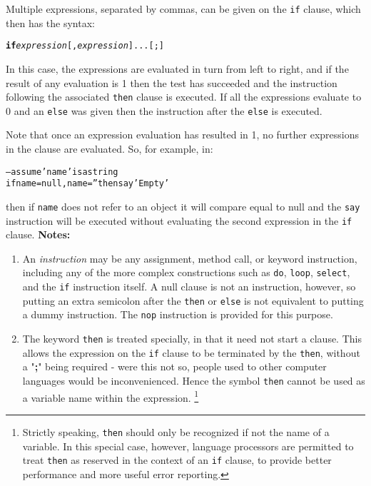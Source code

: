 Multiple expressions, separated by commas, can be given on the
\texttt{if} clause, which then has the syntax:
\begin{shaded}
\begin{alltt}
\textbf{if} \emph{expression}[, \emph{expression}]... [;]
\end{alltt}
\end{shaded}
In this case, the expressions are evaluated in turn from left to
right, and if the result of any evaluation is 1 then the test has
succeeded and the instruction following the associated \texttt{then}
clause is executed.
If all the expressions evaluate to 0 and an \texttt{else} was given
then the instruction after the \texttt{else} is executed.
 
Note that once an expression evaluation has resulted in 1, no further
expressions in the clause are evaluated.  So, for example, in:
\begin{alltt}
-- assume 'name' is a string
if name=null, name='' then say 'Empty'
\end{alltt}
then if \texttt{name} does not refer to an object it will compare equal to
null and the \texttt{say} instruction will be executed without
evaluating the second expression in the \texttt{if} clause.
 \textbf{Notes:}
\begin{enumerate}
\item An \emph{instruction} may be any assignment, method call, or
keyword instruction, including any of the more complex constructions
such as \texttt{do}, \texttt{loop}, \texttt{select}, and the \texttt{if}
instruction itself.
A null clause is not an instruction, however, so putting an extra
semicolon after the \texttt{then} or \texttt{else} is not equivalent to
putting a dummy instruction.
The \texttt{nop} instruction is provided for this purpose.
\item The keyword \texttt{then} is treated specially, in that it need not start a
clause.
This allows the expression on the \texttt{if} clause to be terminated by
the \texttt{then}, without a "\textbf{;}" being required -
were this not so, people used to other computer languages would
be inconvenienced.
Hence the symbol \texttt{then} cannot be used as a variable name within
the expression.
\footnote{
Strictly speaking, \texttt{then} should only be recognized if not
the name of a variable.  In this special case, however, \nr{} language
processors are permitted to treat \texttt{then} as reserved in the
context of an \texttt{if} clause, to provide better performance and
more useful error reporting.
}
\end{enumerate}
